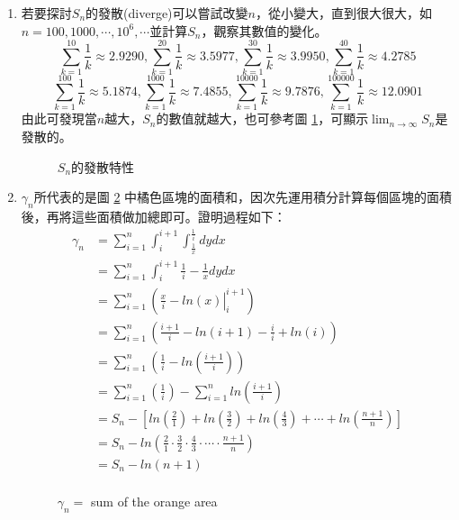 \documentclass[12pt, a4paper]{article}
\begin{document}
\begin{enumerate}
\item 
若要探討$S_n$的發散(diverge)可以嘗試改變$n$，從小變大，直到很大很大，如$n=100, 1000, \cdots, 10^6, \cdots $並計算$S_n$，觀察其數值的變化。\\
$$\sum_{k=1}^{10}\frac{1}{k}\approx 2.9290,\sum_{k=1}^{20}\frac{1}{k}\approx 3.5977,\sum_{k=1}^{30}\frac{1}{k}\approx 3.9950,\sum_{k=1}^{40}\frac{1}{k}\approx 4.2785$$
$$\sum_{k=1}^{100}\frac{1}{k}\approx 5.1874,\sum_{k=1}^{1000}\frac{1}{k}\approx 7.4855,\sum_{k=1}^{10000}\frac{1}{k}\approx 9.7876,\sum_{k=1}^{100000}\frac{1}{k}\approx 12.0901$$
由此可發現當$n$越大，$S_n$的數值就越大，也可參考圖 \ref{fig:Sn}，可顯示$\lim_{n\rightarrow \infty} S_n$是發散的。
\begin{figure}[h]
    \caption{$S_n$的發散特性}
    \label{fig:Sn}
\end{figure}
\item $\gamma_n$所代表的是圖 \ref{fig:riemannsum} 中橘色區塊的面積和，因次先運用積分計算每個區塊的面積後，再將這些面積做加總即可。證明過程如下：
\begin{align*}
\gamma_n &=\sum_{i=1}^n\int_{i}^{i+1} \int_{\frac{1}{x}}^{\frac{1}{i}}dydx \\
         &=\sum_{i=1}^n\int_{i}^{i+1} \frac{1}{i}-\frac{1}{x}dydx \\
         &=\sum_{i=1}^n\left(\left. \frac{x}{i}-ln(x)\right|_{i}^{i+1}\right)\\
         &=\sum_{i=1}^n\left( \frac{i+1}{i}-ln(i+1)-\frac{i}{i}+ln(i)\right) \\
         &=\sum_{i=1}^n\left( \frac{1}{i}-ln\left(\frac{i+1}{i}\right)\right)  \\
         &=\sum_{i=1}^n\left(\frac{1}{i}\right) -\sum_{i=1}^nln\left(\frac{i+1}{i}\right) \\
         &=S_n-\left[ln\left(\frac{2}{1}\right)+ln\left(\frac{3}{2}\right)+ln\left(\frac{4}{3}\right)+\cdots+ln\left(\frac{n+1}{n}\right)\right]\\
         &=S_n-ln\left(\frac{2}{1}\cdot \frac{3}{2}\cdot \frac{4}{3}\cdot \cdots \cdot \frac{n+1}{n}\right)\\
         &=S_n-ln\left(n+1\right)\\
\end{align*}
\begin{figure}[H]
    \caption{$\gamma_n=$ sum of the orange area}
    \label{fig:riemannsum}

\end{figure}
\end{enumerate}
\end{document}
